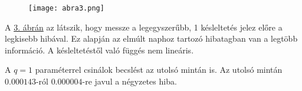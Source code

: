 \documentclass[a4paper,12pt]{article}
\begin{document}
\begin{figure}[H]
\caption{}
        \centering
        \texttt{[image: abra3.png]}
\label{fig:fig3}
\end{figure}

A \hyperref[fig:fig3]{3. ábrán} az látszik, hogy messze a legegyszerűbb, 1 késleltetés jelez előre a legkisebb hibával. 
Ez alapján az elmúlt naphoz tartozó hibatagban van a legtöbb  információ. 
A késleltetéstől való függés nem lineáris. 

A $q=1$ paraméterrel csinálok becslést az utolsó mintán is. 
Az utolsó mintán $0.000143$-ról $0.000004$-re javul a négyzetes hiba.

\newpage


\end{document}
